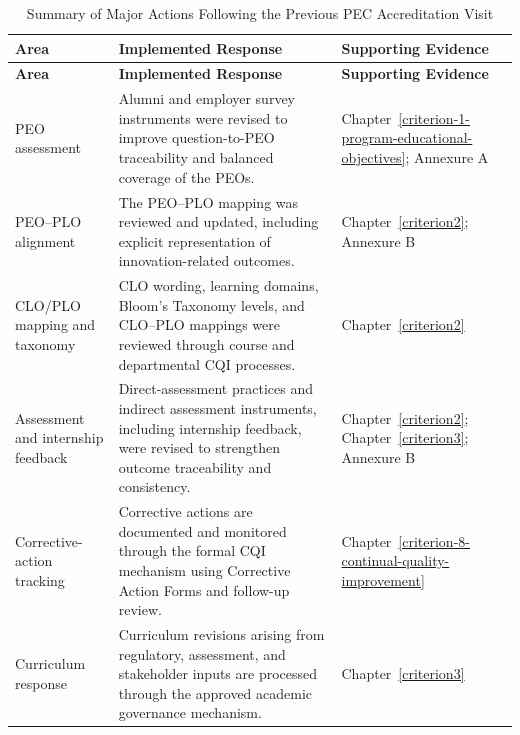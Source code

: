 \begingroup
\footnotesize
\setlength{\tabcolsep}{4pt}
\renewcommand{\arraystretch}{1.15}
\begin{longtable}{@{}>{\raggedright\arraybackslash}p{}>{\raggedright\arraybackslash}p{}>{\raggedright\arraybackslash}p{}@{}}
\caption{Summary of Major Actions Following the Previous PEC Accreditation Visit}
\label{tab:last-visit-summary}\\
\toprule
\textbf{Area} & \textbf{Implemented Response} & \textbf{Supporting Evidence}\\
\midrule
\endfirsthead
\toprule
\textbf{Area} & \textbf{Implemented Response} & \textbf{Supporting Evidence}\\
\midrule
\endhead
\bottomrule
\endlastfoot
PEO assessment & Alumni and employer survey instruments were revised to improve question-to-PEO traceability and balanced coverage of the PEOs. & Chapter~\ref{criterion-1-program-educational-objectives}; Annexure A \\ %

\addlinespace[2pt]
PEO--PLO alignment & The PEO--PLO mapping was reviewed and updated, including explicit representation of innovation-related outcomes. & Chapter~\ref{criterion2}; Annexure B\\
\addlinespace[2pt]
CLO/PLO mapping and taxonomy & CLO wording, learning domains, Bloom's Taxonomy levels, and CLO--PLO mappings were reviewed through course and departmental CQI processes. &  Chapter~\ref{criterion2}\\
\addlinespace[2pt]
Assessment and internship feedback & Direct-assessment practices and indirect assessment instruments, including internship feedback, were revised to strengthen outcome traceability and consistency. & Chapter~\ref{criterion2}; Chapter~\ref{criterion3}; Annexure B\\
\addlinespace[2pt]
Corrective-action tracking & Corrective actions are documented and monitored through the formal CQI mechanism using Corrective Action Forms and follow-up review. & Chapter~\ref{criterion-8-continual-quality-improvement}\\
\addlinespace[2pt]
Curriculum response & Curriculum revisions arising from regulatory, assessment, and stakeholder inputs are processed through the approved academic governance mechanism. & Chapter~\ref{criterion3}\\
\end{longtable}
\endgroup

